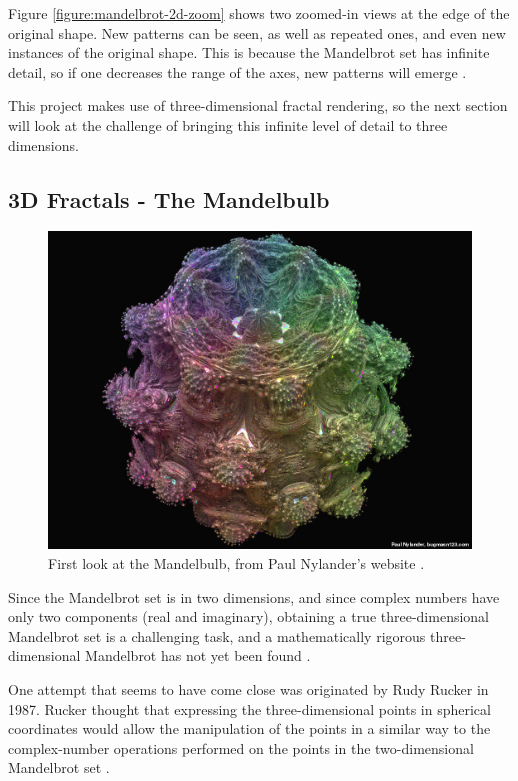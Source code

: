 Figure \ref{figure:mandelbrot-2d-zoom} shows two zoomed-in views at the edge of the original shape. New patterns can be seen, as well as repeated ones, and even new instances of the original shape. This is because the Mandelbrot set has infinite detail, so if one decreases the range of the axes, new patterns will emerge \cite{ashlock2006evolutionary}.\newline

This project makes use of three-dimensional fractal rendering, so the next section will look at the challenge of bringing this infinite level of detail to three dimensions.

\subsection{3D Fractals - The Mandelbulb}

\begin{figure} [ht]
	\centering
	\includegraphics[width=0.5\linewidth, frame]{Images/Mandelbulb-First-Look.jpg}
	\caption{First look at the Mandelbulb, from Paul Nylander's website \cite{nylander-mandelbulb-image}.}
	\label{figure:mandelbulb-first-look}
\end{figure}

Since the Mandelbrot set is in two dimensions, and since complex numbers have only two components (real and imaginary), obtaining a true three-dimensional Mandelbrot set is a challenging task, and a mathematically rigorous three-dimensional Mandelbrot has not yet been found \cite{aron2009mandelbulb}.\newline

One attempt that seems to have come close was originated by Rudy Rucker in 1987. Rucker thought that expressing the three-dimensional points in spherical coordinates would allow the manipulation of the points in a similar way to the complex-number operations performed on the points in the two-dimensional Mandelbrot set \cite{rucker2009search}.\newline

